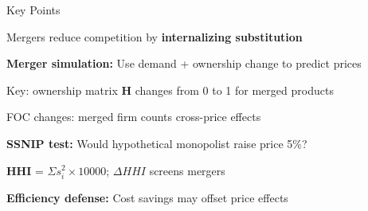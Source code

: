 \documentclass[notes,11pt, aspectratio=169]{beamer}
\newenvironment{wideenumerate}{\enumerate\addtolength{\itemsep}{10pt}}{\endenumerate}
\begin{document}
\begin{frame}{Key Points}
	\vspace{11pt}
	\begin{wideenumerate}
		\item Mergers reduce competition by \textbf{internalizing substitution}
		\item \textbf{Merger simulation:} Use demand + ownership change to predict prices
		\item Key: ownership matrix $\mathbf{H}$ changes from 0 to 1 for merged products
		\item FOC changes: merged firm counts cross-price effects
		\item \textbf{SSNIP test:} Would hypothetical monopolist raise price 5\%?
		\item \textbf{HHI} = $\Sigma s_i^2 \times 10000$; $\Delta HHI$ screens mergers
		\item \textbf{Efficiency defense:} Cost savings may offset price effects
	\end{wideenumerate}
\end{frame}
\end{document}

